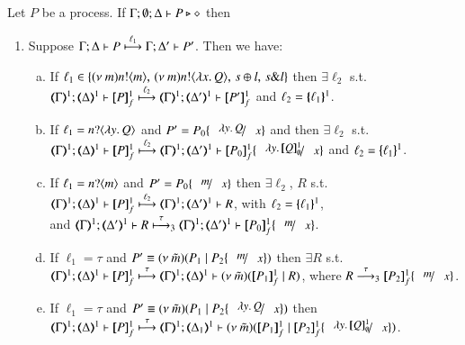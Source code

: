 \begin{proposition}\rm
	\label{prop:op_corr_HOp_to_HO}
	Let $P$ be a \HOp process.
	If $\Gamma; \emptyset; \Delta \proves P \hastype \Proc$ then
	\begin{enumerate}[1.]
		\item
			Suppose $\stytra{\Gamma}{\ell_1}{\Delta}{P}{\Delta'}{P'}$. Then we have:
			\begin{enumerate}[a)]
		    \item 
			If $\ell_1 \in \{\news{m}\bactout{n}{m}, \,\news{m}\bactout{n}{\abs{x}Q}, \,\bactsel{s}{l}, \,\bactbra{s}{l}   \}$
			then $\exists \ell_2$ s.t. \\
			$\stytra{\mapt{\Gamma}^{1}}{\ell_2}{\mapt{\Delta}^{1}}{\pmapp{P}{1}{f}}{\mapt{\Delta'}^{1}}{\pmapp{P'}{1}{f}}$
			and $\ell_2 = \mapa{\ell_1}^{1}$.
			
			\item If $\ell_1 = \bactinp{n}{\abs{y}Q}$ and
			$P' = P_0\subst{\abs{y}Q}{x}$ and			
			then $\exists \ell_2$ s.t. \\
			$\stytra{\mapt{\Gamma}^{1}}{\ell_2}{\mapt{\Delta}^{1}}{\pmapp{P}{1}{f}}{\mapt{\Delta'}^{1}}{\pmapp{P_0}{1}{f}\subst{\abs{y}\pmapp{Q}{1}{\emptyset}}{x}}$
			and $\ell_2 = \mapa{\ell_1}^{1}$.
			
			\item If $\ell_1 = \bactinp{n}{m}$
			and 
			$P' = P_0\subst{m}{x}$
			then $\exists \ell_2$, $R$ s.t. \\
			$\stytra{\mapt{\Gamma}^{1}}{\ell_2}{\mapt{\Delta}^{1}}{\pmapp{P}{1}{f}}{\mapt{\Delta'}^{1}}{R}$,
			with $\ell_2 = \mapa{\ell_1}^{1}$, \\
			and
			$\mapt{\Gamma}^{1}; \mapt{\Delta'}^{1} \proves R \hby{\tau}_3
				\mapt{\Gamma}^{1}; \mapt{\Delta'}^{1} \proves \pmapp{P_0}{1}{f}\subst{m}{x}$.
						
			\item If $\ell_1 = \tau$
			and $P' \scong \news{\tilde{m}}(P_1 \Par P_2\subst{m}{x})$
			then $\exists R$ s.t. \\
			$\stytra{\mapt{\Gamma}^{1}}{\tau}{\mapt{\Delta}^{1}}{\pmapp{P}{1}{f}}{\mapt{\Delta}^{1}}{
			\news{\tilde{m}}(\pmapp{P_1}{1}{f}
			\Par R)
			}$, where $R \by{\tau}_3  \pmapp{P_2}{1}{f}\subst{m}{x}$.

			
			
			
			\item If $\ell_1 = \tau$
			and $P' \scong \news{\tilde{m}}(P_1 \Par P_2\subst{\abs{y}Q}{x})$
			then \\
			$\stytra{\mapt{\Gamma}^{1}}{\tau}{\mapt{\Delta}^{1}}{\pmapp{P}{1}{f}}{\mapt{\Delta_1}^{1}}{
			\news{\tilde{m}}(\pmapp{P_1}{1}{f}
			\Par \pmapp{P_2}{1}{f}\subst{\abs{y}\pmapp{Q}{1}{\emptyset}}{x})
			}$.
			

\end{enumerate}
\end{enumerate}
\end{proposition}

